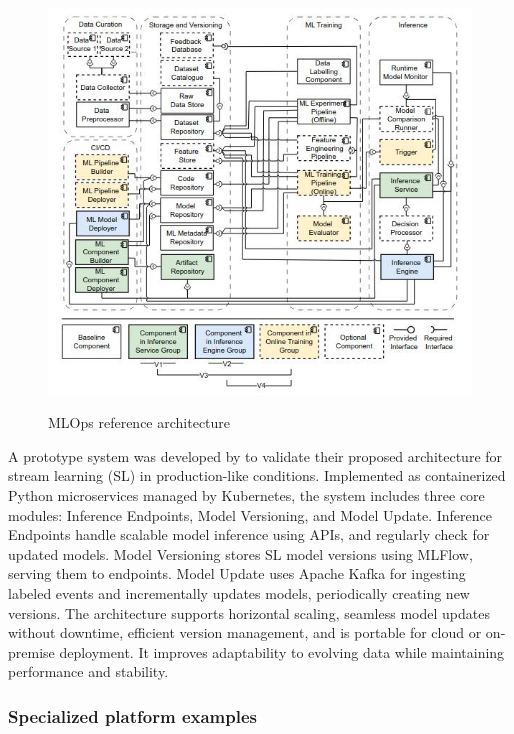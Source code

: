 \begin{figure}[!htbp]
    \caption{MLOps reference architecture\cite{Amou_Najafabadi_2024}}
    \centering
    \includegraphics[scale=0.5]{images/archi-components}
    \label{fig:archi}
\end{figure}

A prototype system was developed by\cite{RODRIGUES2025104169} to validate their proposed architecture for stream learning (SL) in production-like conditions.
Implemented as containerized Python microservices managed by Kubernetes, the system includes three core modules: Inference Endpoints, Model Versioning, and Model Update.
Inference Endpoints handle scalable model inference using APIs, and regularly check for updated models.
Model Versioning stores SL model versions using MLFlow, serving them to endpoints.
Model Update uses Apache Kafka for ingesting labeled events and incrementally updates models, periodically creating new versions.
The architecture supports horizontal scaling, seamless model updates without downtime, efficient version management,
and is portable for cloud or on-premise deployment.
It improves adaptability to evolving data while maintaining performance and stability.

\subsubsection{Specialized platform examples}

